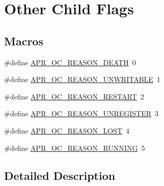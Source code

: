 \hypertarget{group___a_p_r___o_c}{\section{Other Child Flags}
\label{group___a_p_r___o_c}
}
\subsection*{Macros}
\begin{DoxyCompactItemize}
\item 
\#define \hyperlink{group___a_p_r___o_c_ga93a18b17cfedca0c7c99c696508c935b}{A\-P\-R\-\_\-\-O\-C\-\_\-\-R\-E\-A\-S\-O\-N\-\_\-\-D\-E\-A\-T\-H}~0
\item 
\#define \hyperlink{group___a_p_r___o_c_gae4cb4983512df7df00c9c0401efba9c9}{A\-P\-R\-\_\-\-O\-C\-\_\-\-R\-E\-A\-S\-O\-N\-\_\-\-U\-N\-W\-R\-I\-T\-A\-B\-L\-E}~1
\item 
\#define \hyperlink{group___a_p_r___o_c_ga5ae054b0b4c7c8eea911c146ae9ccdce}{A\-P\-R\-\_\-\-O\-C\-\_\-\-R\-E\-A\-S\-O\-N\-\_\-\-R\-E\-S\-T\-A\-R\-T}~2
\item 
\#define \hyperlink{group___a_p_r___o_c_ga7fe88662b788e07800290f68575b2f4b}{A\-P\-R\-\_\-\-O\-C\-\_\-\-R\-E\-A\-S\-O\-N\-\_\-\-U\-N\-R\-E\-G\-I\-S\-T\-E\-R}~3
\item 
\#define \hyperlink{group___a_p_r___o_c_ga5d441798b20b93bd1f609264d03690fb}{A\-P\-R\-\_\-\-O\-C\-\_\-\-R\-E\-A\-S\-O\-N\-\_\-\-L\-O\-S\-T}~4
\item 
\#define \hyperlink{group___a_p_r___o_c_gaa4a7ca44f23d67e7e19fd59bf41abd6a}{A\-P\-R\-\_\-\-O\-C\-\_\-\-R\-E\-A\-S\-O\-N\-\_\-\-R\-U\-N\-N\-I\-N\-G}~5
\end{DoxyCompactItemize}


\subsection{Detailed Description}


